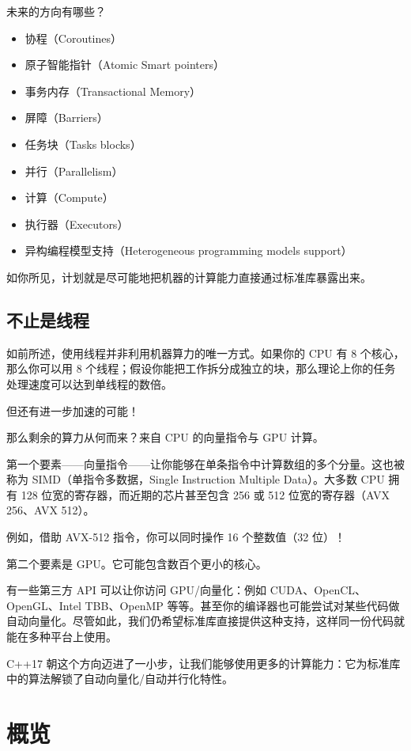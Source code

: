 未来的方向有哪些？
\begin{itemize}
\item 协程（Coroutines）
\item 原子智能指针（Atomic Smart pointers）
\item 事务内存（Transactional Memory）
\item 屏障（Barriers）
\item 任务块（Tasks blocks）
\item 并行（Parallelism）
\item 计算（Compute）
\item 执行器（Executors）
\item 异构编程模型支持（Heterogeneous programming models support）
\end{itemize}

如你所见，计划就是尽可能地把机器的计算能力直接通过标准库暴露出来。


\subsection{不止是线程}

如前所述，使用线程并非利用机器算力的唯一方式。如果你的 CPU 有 8 个核心，那么你可以用 8 个线程；假设你能把工作拆分成独立的块，那么理论上你的任务处理速度可以达到单线程的数倍。

但还有进一步加速的可能！

那么剩余的算力从何而来？来自 CPU 的向量指令与 GPU 计算。

第一个要素——向量指令——让你能够在单条指令中计算数组的多个分量。这也被称为 SIMD（单指令多数据，Single Instruction Multiple Data）。大多数 CPU 拥有 128 位宽的寄存器，而近期的芯片甚至包含 256 或 512 位宽的寄存器（AVX 256、AVX 512）。

例如，借助 AVX-512 指令，你可以同时操作 16 个整数值（32 位）！

第二个要素是 GPU。它可能包含数百个更小的核心。

有一些第三方 API 可以让你访问 GPU/向量化：例如 CUDA、OpenCL、OpenGL、Intel TBB、OpenMP 等等。甚至你的编译器也可能尝试对某些代码做自动向量化。尽管如此，我们仍希望标准库直接提供这种支持，这样同一份代码就能在多种平台上使用。

C++17 朝这个方向迈进了一小步，让我们能够使用更多的计算能力：它为标准库中的算法解锁了自动向量化/自动并行化特性。


\section{概览}

